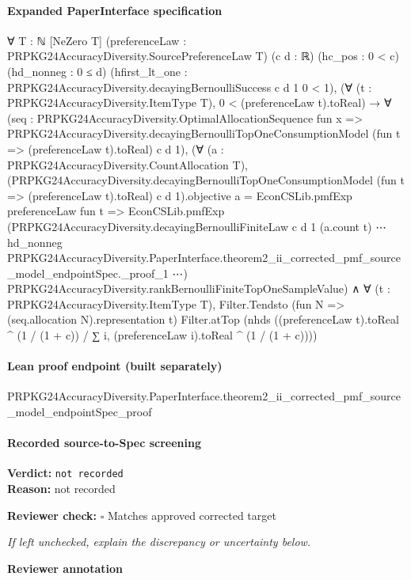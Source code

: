 \documentclass[10pt]{article}
\newcommand{\reviewerbox}{%
  \par\noindent\fbox{\parbox{0.96\linewidth}{\rule{0pt}{0.38in}}}\par
}
\newcommand{\reviewmatch}[1]{%
  \par\noindent\textbf{Reviewer check:} $\square$\; #1\par
  \noindent\emph{If left unchecked, explain the discrepancy or uncertainty below.}\par
}
\begin{document}
\paragraph{Expanded PaperInterface specification}
\begin{ReviewVerbatim}
∀ {T : ℕ} [NeZero T] (preferenceLaw : PRPKG24AccuracyDiversity.SourcePreferenceLaw T) (c d : ℝ) (hc_pos : 0 < c)
  (hd_nonneg : 0 ≤ d) (hfirst_lt_one : PRPKG24AccuracyDiversity.decayingBernoulliSuccess c d 1 0 < 1),
  (∀ (t : PRPKG24AccuracyDiversity.ItemType T), 0 < (preferenceLaw t).toReal) →
    ∀
      (seq :
        PRPKG24AccuracyDiversity.OptimalAllocationSequence fun x =>
          PRPKG24AccuracyDiversity.decayingBernoulliTopOneConsumptionModel (fun t => (preferenceLaw t).toReal) c d 1),
      (∀ (a : PRPKG24AccuracyDiversity.CountAllocation T),
          (PRPKG24AccuracyDiversity.decayingBernoulliTopOneConsumptionModel (fun t => (preferenceLaw t).toReal) c d
                  1).objective
              a =
            EconCSLib.pmfExp preferenceLaw fun t =>
              EconCSLib.pmfExp
                (PRPKG24AccuracyDiversity.decayingBernoulliFiniteLaw c d 1 (a.count t) ⋯ hd_nonneg
                  PRPKG24AccuracyDiversity.PaperInterface.theorem2_ii_corrected_pmf_source_model_endpointSpec._proof_1
                  ⋯)
                PRPKG24AccuracyDiversity.rankBernoulliFiniteTopOneSampleValue) ∧
        ∀ (t : PRPKG24AccuracyDiversity.ItemType T),
          Filter.Tendsto (fun N => (seq.allocation N).representation t) Filter.atTop
            (nhds ((preferenceLaw t).toReal ^ (1 / (1 + c)) / ∑ i, (preferenceLaw i).toReal ^ (1 / (1 + c))))
\end{ReviewVerbatim}

\paragraph{Lean proof endpoint (built separately)}\begin{ReviewVerbatim}
PRPKG24AccuracyDiversity.PaperInterface.theorem2_ii_corrected_pmf_source_model_endpointSpec_proof
\end{ReviewVerbatim}

\paragraph{Recorded source-to-Spec screening}
\textbf{Verdict:} \texttt{not recorded}
\\
\textbf{Reason:} not recorded
\reviewmatch{Matches approved corrected target}
\noindent\textbf{Reviewer annotation}\par
\reviewerbox
\clearpage
\hypertarget{source-claim-3057a09badb30d45}{}
\end{document}
